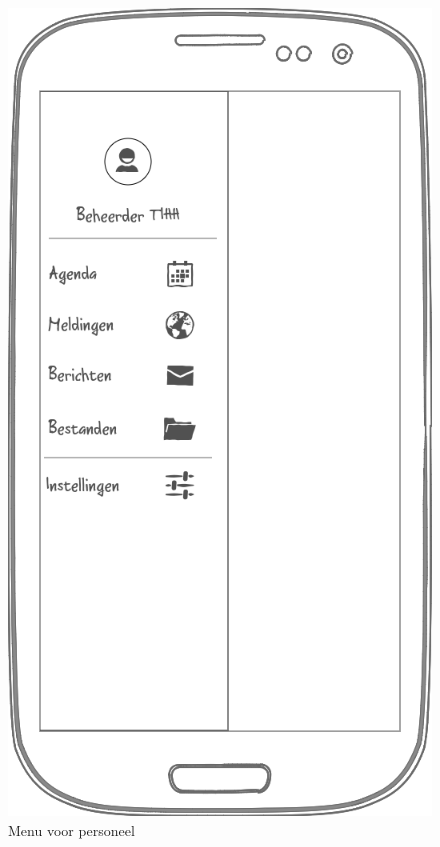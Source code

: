 \documentclass[a4paper]{article}
\begin{document}
\begin{appendices}
\newpage
\begin{figure}[H]
  \centerline{\includegraphics[width=\textwidth*4/5]{mobiel_personeel}}
  \caption{Menu voor personeel}
  \label{fig:mobiel_personeel}
\end{figure}


\end{appendices}
\end{document}
